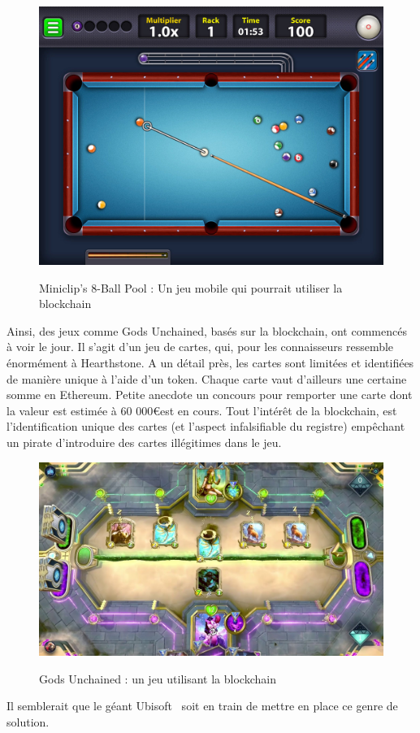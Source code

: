 \documentclass[12pt, a4paper, oneside]{book}
\begin{document}
    \begin{figure}[H]
        \begin{center}
          \includegraphics[width=.43\textwidth]{images/billard.jpg}
          \label{fig:billard}
          \caption{Miniclip’s 8-Ball Pool : Un jeu mobile qui pourrait utiliser la blockchain}
        \end{center}
    \end{figure}
    Ainsi, des jeux comme Gods Unchained, basés sur la blockchain, ont commencés à voir le jour. Il s'agit d'un jeu de cartes, qui, pour les connaisseurs ressemble énormément à Hearthstone. A un détail près, les cartes sont limitées et identifiées de manière unique à l'aide d'un token. Chaque carte vaut d'ailleurs une certaine somme en Ethereum. Petite anecdote un concours pour remporter une carte dont la valeur est estimée à 60 000\euro  est en cours. Tout l'intérêt de la blockchain, est l'identification unique des cartes (et l'aspect infalsifiable du registre) empêchant un pirate d'introduire des cartes illégitimes dans le jeu.
    
    \begin{figure}[H]
        \begin{center}
          \includegraphics[width=.69\textwidth]{images/godsunchained.jpg}
          \label{fig:jeucartes}
          \caption{Gods Unchained : un jeu utilisant la blockchain}
        \end{center}
    \end{figure}

    Il semblerait que le géant Ubisoft~\cite{ubi} soit en train de mettre en place ce genre de solution.
\end{document}
